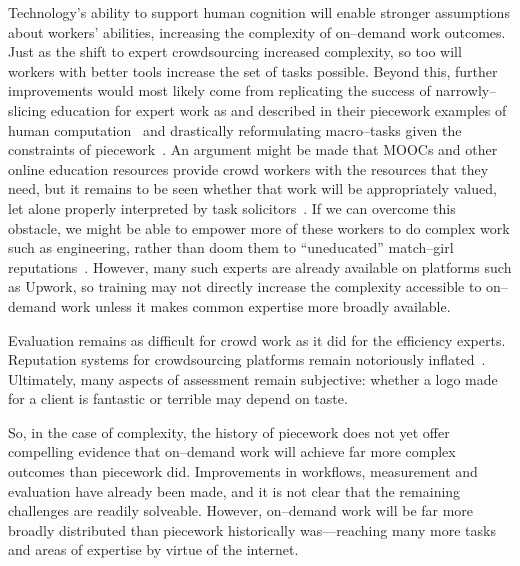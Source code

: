 \documentclass[trackingWork]{subfiles}
\begin{document}
Technology's ability to support human cognition will enable stronger assumptions about workers' abilities, increasing the complexity of on--demand work outcomes.
Just as the shift to expert crowdsourcing increased complexity, so too will workers with better tools increase the set of tasks possible.
Beyond this, further improvements would most likely come from replicating the success of narrowly--slicing education for expert work as \citeauthor{hart2013rise} and \citeauthor{grier2013computers} described in their piecework examples
of human computation~\cite{grier2013computers} and
drastically reformulating macro--tasks given the constraints of piecework~\cite{hart2013rise}.
An argument might be made that
MOOCs and other online education resources
provide crowd workers with the resources that they need, but 
it remains to be seen whether that work will be appropriately valued, let alone
properly interpreted by task solicitors~\cite{aguaded2013mooc}.
If we can overcome this obstacle,
we might be able to empower more of these workers to do complex work such as engineering,
rather than doom them to ``uneducated'' match--girl reputations~\cite{10.2307/3827491}.
However, many such experts are already available on platforms such as Upwork, so training may not directly increase the complexity accessible to on--demand work unless it makes common expertise more broadly available.

Evaluation remains as difficult for crowd work as it did for the efficiency experts. 
Reputation systems for crowdsourcing platforms remain notoriously inflated~\cite{Horton2015a}.
Ultimately, many aspects of assessment remain subjective: whether a logo made for a client is fantastic or terrible may depend on taste.

So, in the case of complexity, the history of piecework does not yet offer compelling evidence that on--demand work will achieve far more complex outcomes than piecework did.
Improvements in workflows, measurement and evaluation have already been made, and it is not clear that the remaining challenges are readily solveable.
However, on--demand work will be far more broadly distributed than piecework historically was---reaching many more tasks and areas of expertise by virtue of the internet.
\end{document}
